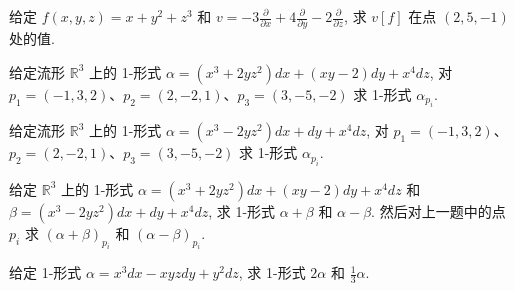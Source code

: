 \begin{question}\label{q:2-26}
给定 $f(x,y,z)=x+y^2+z^3$ 和 $v=-3\frac{\partial}{\partial x}+4\frac{\partial}{\partial y}-2\frac{\partial}{\partial z}$, 求 $v[f]$ 在点 $(2,5,-1)$ 处的值.
\end{question}

\begin{question}\label{q:2-27}
给定流形 $\mathbb{R}^3$ 上的 1-形式 $\alpha=(x^3+2yz^2)dx+(xy-2)dy+x^4dz$, 对 $p_1=(-1,3,2)$、$p_2=(2,-2,1)$、$p_3=(3,-5,-2)$ 求 1-形式 $\alpha_{p_i}$.
\end{question}

\begin{question}\label{q:2-28}
给定流形 $\mathbb{R}^3$ 上的 1-形式 $\alpha=(x^3-2yz^2)dx+dy+x^4dz$, 对 $p_1=(-1,3,2)$、$p_2=(2,-2,1)$、$p_3=(3,-5,-2)$ 求 1-形式 $\alpha_{p_i}$.
\end{question}

\begin{question}\label{q:2-29}
给定 $\mathbb{R}^3$ 上的 1-形式 $\alpha=(x^3+2yz^2)dx+(xy-2)dy+x^4dz$ 和 $\beta=(x^3-2yz^2)dx+dy+x^4dz$, 求 1-形式 $\alpha+\beta$ 和 $\alpha-\beta$. 然后对上一题中的点 $p_i$ 求 $(\alpha+\beta)_{p_i}$ 和 $(\alpha-\beta)_{p_i}$.
\end{question}

\begin{question}\label{q:2-30}
给定 1-形式 $\alpha=x^3dx-xyzdy+y^2dz$, 求 1-形式 $2\alpha$ 和 $\frac13\alpha$.
\end{question}

